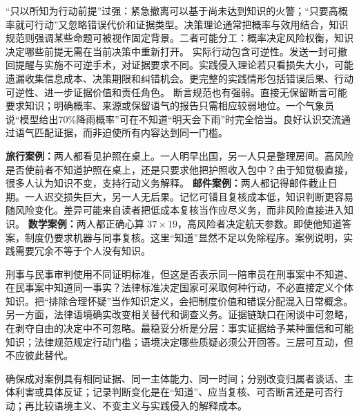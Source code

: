 “只以所知为行动前提”过强：紧急撤离可以基于尚未达到知识的火警；“只要高概率就可行动”又忽略错误代价和证据类型。决策理论通常把概率与效用结合，知识规范则强调某些命题可被视作固定背景。二者可能分工：概率决定风险权衡，知识决定哪些前提无需在当前决策中重新打开。 实际行动包含可逆性。发送一封可撤回提醒与实施不可逆手术，对证据要求不同。实践侵入理论若只看损失大小，可能遗漏收集信息成本、决策期限和纠错机会。更完整的实践情形包括错误后果、行动可逆性、进一步证据价值和责任角色。 断言规范也有强弱。直接无保留断言可能要求知识；明确概率、来源或保留语气的报告只需相应较弱地位。一个气象员说“模型给出70\%降雨概率”可在不知道“明天会下雨”时完全恰当。良好认识交流通过语气匹配证据，而非迫使所有内容达到同一门槛。

\textbf{旅行案例：}两人都看见护照在桌上。一人明早出国，另一人只是整理房间。高风险是否使前者不知道护照在桌上，还是只要求他把护照收入包中？由于知觉极直接，很多人认为知识不变，支持行动义务解释。 \textbf{邮件案例：}两人都记得邮件截止日期。一人迟交损失巨大，另一人无后果。记忆可错且复核成本低，知识判断更容易随风险变化。差异可能来自读者把低成本复核当作应尽义务，而非风险直接进入知识。 \textbf{数学案例：}两人都正确心算 $37\times 19$，高风险者决定航天参数。即使他知道答案，制度仍要求机器与同事复核。这里“知道”显然不足以免除程序。案例说明，实践需要冗余不等于个人没有知识。

刑事与民事审判使用不同证明标准，但这是否表示同一陪审员在刑事案中不知道、在民事案中知道同一事实？法律标准决定国家可采取何种行动，不必直接定义个体知识。把“排除合理怀疑”当作知识定义，会把制度价值和错误分配混入日常概念。 另一方面，法律语境确实改变相关替代和调查义务。证据链缺口在闲谈中可忽略，在剥夺自由的决定中不可忽略。最稳妥分析是分层：事实证据给予某种置信和可能知识；法律规范规定行动门槛；语境决定哪些质疑必须公开回答。三层可互动，但不应彼此替代。

\begin{tcolorbox}[breakable,colback=white,colframe=blue!30!black,title={语境案例控制表},fonttitle=\bfseries]
确保成对案例具有相同证据、同一主体能力、同一时间；分别改变归属者谈话、主体利害或具体反证；记录判断变化是在“知道”、应当复核、可否断言还是可否行动；再比较语境主义、不变主义与实践侵入的解释成本。
\end{tcolorbox}
